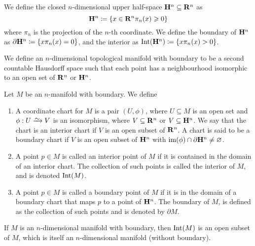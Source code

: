 \begin{definition}\label{def:upper-half-space}
We define the closed \(n\)-dimensional upper half-space \(\mathbf{H}^n \subseteq
\mathbf{R}^n\) as
\[
  \mathbf{H}^n \coloneq \{x \in \mathbf{R}^n \relax \pi_n(x) \geqslant 0\}
\]
where \(\pi_n\) is the projection of the \(n\)-th coordinate. We define the
boundary of \(\mathbf{H}^n\) as \(\partial \mathbf{H}^n \coloneq \{x \relax \pi_n(x) = 0\}\),
and the interior as \(\operatorname{Int}(\mathbf{H}^n) \coloneq \{x \relax \pi_n(x) > 0\}\).
\end{definition}

\begin{definition}
\label{def: manifold with boundary}
We define an \(n\)-dimensional topological manifold with boundary to be a
second countable Hausdorff space such that each point has a neighbourhood
isomorphic to an open set of \(\mathbf{R}^n\) or \(\mathbf{H}^n\).
\end{definition}

\begin{definition}[Miscelaneous]
Let \(M\) be an \(n\)-manifold with boundary. We define
\begin{enumerate}[(MB1)]
  \item A coordinate chart for \(M\) is a pair \((U, \phi)\), where \(U
    \subseteq M\) is an open set and \(\phi: U \isoto V\) is an isomorphism,
    where \(V \subseteq \mathbf{R}^n\) or \(V \subseteq \mathbf{H}^n\). We say that the chart
    is an interior chart if \(V\) is an open subset of \(\mathbf{R}^n\). A chart is said
    to be a boundary chart if \(V\) is an open subset of \(\mathbf{H}^n\) with
    \(\operatorname{im}(\phi) \cap \partial \mathbf{H}^n \neq \varnothing\).
  \item A point \(p \in M\) is called an interior point of \(M\) if it is
    contained in the domain of an interior chart. The collection of such
    points is called the interior of \(M\), and is denoted \(\operatorname{Int}(M)\).
  \item A point \(p \in M\) is called a boundary point of \(M\) if it is in
    the domain of a boundary chart that maps \(p\) to a point of
    \(\mathbf{H}^n\). The boundary of \(M\), is defined as the collection of
    such points and is denoted by \(\partial M\).
\end{enumerate}
\end{definition}

\begin{proposition}\label{prop: interior is a manifold}
If \(M\) is an \(n\)-dimensional manifold with boundary, then \(\operatorname{Int}(M)\) is
an open subset of \(M\), which is itself an \(n\)-dimensional manifold
(without boundary).
\end{proposition}

